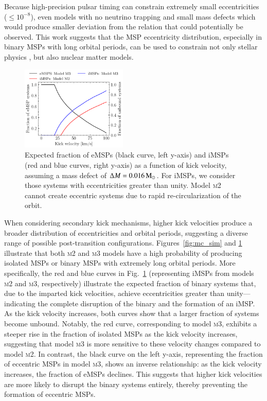 \documentclass[main.tex]{subfiles}
\begin{document}
    Because high-precision pulsar timing can constrain extremely small eccentricities ($\leq 10^{-8}$), even models with no neutrino trapping and small mass defects which would produce smaller deviation from the \cite{Phinney:1992} relation that could potentially be observed. This work suggests that the  MSP eccentricity distribution, especially in binary MSPs with long orbital periods,  can be used to constrain  not only stellar physics \citep{Phinney:1992, antoniadis:apjl14}, but also  nuclear matter models.   

    \begin{figure}[ht]
        \centering
        \includegraphics[width=0.45\textwidth]{figures/chapter4/emsp_vs_imsp.pdf}
        \caption{Expected fraction of eMSPs (black curve, left y-axis) and iMSPs (red and blue curves, right y-axis) as a function of kick velocity, assuming a mass defect of $\Delta M = 0.016\mathrm{\,M_\odot}$. For iMSPs, we consider those systems with eccentricities greater than unity. Model \textsc{m2} cannot create eccentric systems due to rapid re-circularization of the orbit.}
        \label{fig:emsps_vs_imsps}
    \end{figure}
    
    When considering secondary kick mechanisms, higher kick velocities produce a broader distribution of eccentricities and orbital periods, suggesting a diverse range of possible post-transition configurations. Figures~\ref{fig:mc_sim} and \ref{fig:emsps_vs_imsps} illustrate that both \textsc{m2} and \textsc{m3} models have a high probability of producing isolated MSPs or binary MSPs with extremely long orbital periods. More specifically, the red and blue curves in Fig.~\ref{fig:emsps_vs_imsps} (representing iMSPs from models \textsc{m2} and \textsc{m3}, respectively) illustrate the expected fraction of binary systems that, due to the imparted kick velocities, achieve eccentricities greater than unity—indicating the complete disruption of the binary and the formation of an iMSP. As the kick velocity increases, both curves show that a larger fraction of systems become unbound. Notably, the red curve, corresponding to model \textsc{m3}, exhibits a steeper rise in the fraction of isolated MSPs as the kick velocity increases, suggesting that model \textsc{m3} is more sensitive to these velocity changes compared to model \textsc{m2}. In contrast, the black curve on the left y-axis, representing the fraction of eccentric MSPs in model \textsc{m3}, shows an inverse relationship: as the kick velocity increases, the fraction of eMSPs declines. This suggests that higher kick velocities are more likely to disrupt the binary systems entirely, thereby preventing the formation of eccentric MSPs.
    
\end{document}
